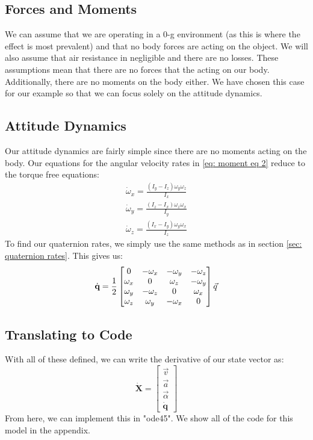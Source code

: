 \documentclass[12pt]{report}
\begin{document}
\subsection{Forces and Moments}
We can assume that we are operating in a 0-g environment (as this is where the effect is most prevalent) and that no body forces are acting on the object. We will also assume that air resistance in negligible and there are no losses. These assumptions mean that there are no forces that the acting on our body. Additionally, there are no moments on the body either. We have chosen this case for our example so that we can focus solely on the attitude dynamics.
\subsection{Attitude Dynamics}
Our attitude dynamics are fairly simple since there are no moments acting on the body. Our equations for the angular velocity rates in \eqref{eq: moment eq 2} reduce to the torque free equations:
\begin{gather}\label{eq: moment eq dzhan}
    \dot{\omega}_x=\frac{\left(I_y-I_z\right)\omega_y\omega_z}{I_x}\\
    \dot{\omega}_y=\frac{\left(I_z-I_x\right)\omega_z\omega_x}{I_y}\\
    \dot{\omega}_z=\frac{\left(I_x-I_y\right)\omega_y\omega_x}{I_z}
\end{gather}
To find our \gls{quaternion} rates, we simply use the same methods as in section \ref{sec: quaternion rates}. This gives us:
\begin{gather}
{\color{black}\dot{\textbf{q}}=\frac{1}{2}\begin{bmatrix}
        0&-\omega_x&-\omega_y&-\omega_z\\
        \omega_x&0&\omega_z&-\omega_y\\
        \omega_y&-\omega_z&0&\omega_x\\
        \omega_z&\omega_y&-\omega_x&0
    \end{bmatrix}\vec{q}}
\end{gather}
\subsection{Translating to Code}
With all of these defined, we can write the derivative of our \gls{state vector} as:
\begin{equation}
    \dot{\textbf{X}}=\begin{bmatrix}
        \vec{v}\\\vec{a}\\\vec{\alpha}\\\dot{\textbf{q}}
    \end{bmatrix}
\end{equation}
From here, we can implement this in "ode45". We show all of the code for this model in the appendix.
\end{document}
